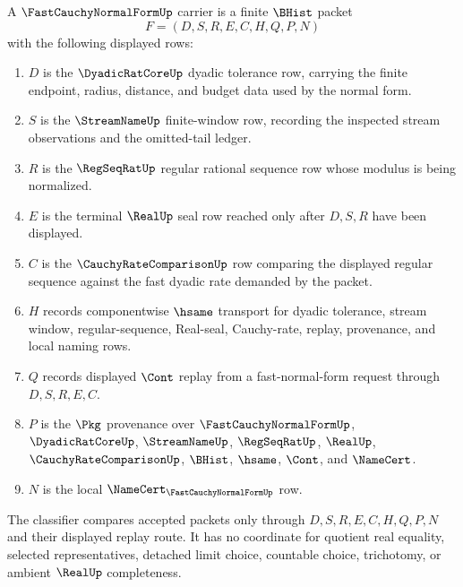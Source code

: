 \begin{definition}
\label{def:real-fast-cauchy-normal-form-carrier}
A $\FastCauchyNormalFormUp$ carrier is a finite $\BHist$ packet
$$
F=(D,S,R,E,C,H,Q,P,N)
$$
with the following displayed rows:
\begin{enumerate}
\item $D$ is the $\DyadicRatCoreUp$ dyadic tolerance row, carrying the finite endpoint, radius, distance, and budget data used by the normal form.
\item $S$ is the $\StreamNameUp$ finite-window row, recording the inspected stream observations and the omitted-tail ledger.
\item $R$ is the $\RegSeqRatUp$ regular rational sequence row whose modulus is being normalized.
\item $E$ is the terminal $\RealUp$ seal row reached only after $D,S,R$ have been displayed.
\item $C$ is the $\CauchyRateComparisonUp$ row comparing the displayed regular sequence against the fast dyadic rate demanded by the packet.
\item $H$ records componentwise $\hsame$ transport for dyadic tolerance, stream window, regular-sequence, Real-seal, Cauchy-rate, replay, provenance, and local naming rows.
\item $Q$ records displayed $\Cont$ replay from a fast-normal-form request through $D,S,R,E,C$.
\item $P$ is the $\Pkg$ provenance over $\FastCauchyNormalFormUp$, $\DyadicRatCoreUp$, $\StreamNameUp$, $\RegSeqRatUp$, $\RealUp$, $\CauchyRateComparisonUp$, $\BHist$, $\hsame$, $\Cont$, and $\NameCert$.
\item $N$ is the local $\NameCert_{\FastCauchyNormalFormUp}$ row.
\end{enumerate}
The classifier compares accepted packets only through $D,S,R,E,C,H,Q,P,N$ and their displayed replay route. It has no coordinate for quotient real equality, selected representatives, detached limit choice, countable choice, trichotomy, or ambient $\RealUp$ completeness.
\end{definition}

